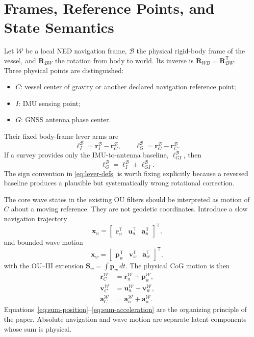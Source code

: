 \documentclass[conference]{IEEEtran}
\DeclareRobustCommand{\vct}[1]{\bm{#1}}
\DeclareRobustCommand{\mat}[1]{\bm{#1}}
\newcommand{\T}{^{\mathsf T}}
\begin{document}
\section{Frames, Reference Points, and State Semantics}
\label{sec:frames}

Let $\mathcal W$ be a local NED navigation frame, $\mathcal B$ the physical rigid-body
frame of the vessel, and $\mat R_{BW}$ the rotation from body to world.  Its inverse is
$\mat R_{WB}=\mat R_{BW}\T$.  Three physical points are distinguished:
\begin{itemize}
  \item $C$: vessel center of gravity or another declared navigation reference point;
  \item $I$: IMU sensing point;
  \item $G$: GNSS antenna phase center.
\end{itemize}
Their fixed body-frame lever arms are
\begin{equation}
\vct \ell_I^{\mathcal B}=\vct r_I^{\mathcal B}-\vct r_C^{\mathcal B},
\qquad
\vct \ell_G^{\mathcal B}=\vct r_G^{\mathcal B}-\vct r_C^{\mathcal B}.
\label{eq:lever-defs}
\end{equation}
If a survey provides only the IMU-to-antenna baseline,
$\vct \ell_{GI}^{\mathcal B}$, then
\begin{equation}
\vct \ell_G^{\mathcal B}=\vct \ell_I^{\mathcal B}+\vct \ell_{GI}^{\mathcal B}.
\label{eq:lever-compose}
\end{equation}
The sign convention in \cref{eq:lever-defs} is worth fixing explicitly because a
reversed baseline produces a plausible but systematically wrong rotational
correction.

The core wave states in the existing OU filters should be interpreted as motion of
$C$ about a moving reference.  They are not geodetic coordinates.  Introduce a slow
navigation trajectory
\begin{equation}
\vct x_n=
\begin{bmatrix}
\vct r_n\T & \vct u_n\T & \vct a_n\T
\end{bmatrix}\T,
\label{eq:nav-state}
\end{equation}
and bounded wave motion
\begin{equation}
\vct x_w=
\begin{bmatrix}
\vct p_w\T & \vct v_w\T & \vct a_w\T
\end{bmatrix}\T,
\label{eq:wave-state}
\end{equation}
with the OU--III extension $\vct S_w=\int\vct p_w\,dt$.  The physical CoG motion is
then
\begin{align}
\vct r_C^{\mathcal W} &= \vct r_n^{\mathcal W}+\vct p_w^{\mathcal W},
\label{eq:sum-position}\\
\vct v_C^{\mathcal W} &= \vct u_n^{\mathcal W}+\vct v_w^{\mathcal W},
\label{eq:sum-velocity}\\
\vct a_C^{\mathcal W} &= \vct a_n^{\mathcal W}+\vct a_w^{\mathcal W}.
\label{eq:sum-acceleration}
\end{align}
Equations~\eqref{eq:sum-position}--\eqref{eq:sum-acceleration} are the organizing
principle of the paper.  Absolute navigation and wave motion are separate latent
components whose sum is physical.
\end{document}
